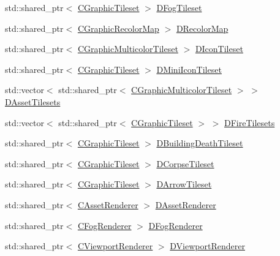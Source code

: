 \begin{DoxyCompactItemize}
std\+::shared\+\_\+ptr$<$ \hyperlink{classCGraphicTileset}{C\+Graphic\+Tileset} $>$ \hyperlink{classCApplicationData_a9d9103087da6592c08b8d6c669665323}{D\+Fog\+Tileset}
\item 
std\+::shared\+\_\+ptr$<$ \hyperlink{classCGraphicRecolorMap}{C\+Graphic\+Recolor\+Map} $>$ \hyperlink{classCApplicationData_afcbfb5d837afd5c117d91216d1988a53}{D\+Recolor\+Map}
\item 
std\+::shared\+\_\+ptr$<$ \hyperlink{classCGraphicMulticolorTileset}{C\+Graphic\+Multicolor\+Tileset} $>$ \hyperlink{classCApplicationData_a0577767a7fa045a51654b881608b1e7a}{D\+Icon\+Tileset}
\item 
std\+::shared\+\_\+ptr$<$ \hyperlink{classCGraphicTileset}{C\+Graphic\+Tileset} $>$ \hyperlink{classCApplicationData_aa7d7e4c8be514246089546f4d98d74f2}{D\+Mini\+Icon\+Tileset}
\item 
std\+::vector$<$ std\+::shared\+\_\+ptr$<$ \hyperlink{classCGraphicMulticolorTileset}{C\+Graphic\+Multicolor\+Tileset} $>$ $>$ \hyperlink{classCApplicationData_a1aaf56a300b30c5e2484a5359366d77a}{D\+Asset\+Tilesets}
\item 
std\+::vector$<$ std\+::shared\+\_\+ptr$<$ \hyperlink{classCGraphicTileset}{C\+Graphic\+Tileset} $>$ $>$ \hyperlink{classCApplicationData_a68f7be36ab8b46ea7fca3bd3e79784cd}{D\+Fire\+Tilesets}
\item 
std\+::shared\+\_\+ptr$<$ \hyperlink{classCGraphicTileset}{C\+Graphic\+Tileset} $>$ \hyperlink{classCApplicationData_ab463f816076fec8d43ecfe61120e8e6b}{D\+Building\+Death\+Tileset}
\item 
std\+::shared\+\_\+ptr$<$ \hyperlink{classCGraphicTileset}{C\+Graphic\+Tileset} $>$ \hyperlink{classCApplicationData_aec983aa995cdb449344422d607fe0228}{D\+Corpse\+Tileset}
\item 
std\+::shared\+\_\+ptr$<$ \hyperlink{classCGraphicTileset}{C\+Graphic\+Tileset} $>$ \hyperlink{classCApplicationData_a5c617fcea02a399ecffee313eead2159}{D\+Arrow\+Tileset}
\item 
std\+::shared\+\_\+ptr$<$ \hyperlink{classCAssetRenderer}{C\+Asset\+Renderer} $>$ \hyperlink{classCApplicationData_a5b42401441ae3a70fb4bd26f5dfdba01}{D\+Asset\+Renderer}
\item 
std\+::shared\+\_\+ptr$<$ \hyperlink{classCFogRenderer}{C\+Fog\+Renderer} $>$ \hyperlink{classCApplicationData_ad825b9b196c31f92700541e1332009cc}{D\+Fog\+Renderer}
\item 
std\+::shared\+\_\+ptr$<$ \hyperlink{classCViewportRenderer}{C\+Viewport\+Renderer} $>$ \hyperlink{classCApplicationData_a31da050ebca942272344c8b736d72848}{D\+Viewport\+Renderer}

\end{DoxyCompactItemize}
